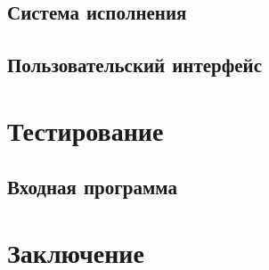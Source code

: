 \documentclass[12pt]{article}
\begin{document}
		\subsection{Система исполнения}
		\subsection{Пользовательский интерфейс}
	\newpage
	\section{Тестирование}
		\subsection{Входная программа}
	\newpage	
	\section{Заключение}
	\newpage
	\nocite{*}
			
	
	
	\newpage
	\tableofcontents %
\end{document}

